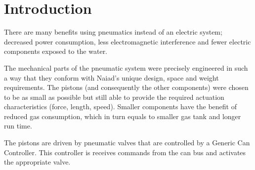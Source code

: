 \section{Introduction}\label{sec:introduction}
There are many benefits using pneumatics instead of an electric  system; decreased power consumption, less electromagnetic interference and fewer electric components exposed to the water.

The mechanical parts of the pneumatic system were precisely engineered in such a way that they conform with Naiad's unique design, space and weight requirements. The pistons (and consequently the other components) were chosen to be as small as possible but still able to provide the required actuation characteristics (force, length, speed). Smaller components have the benefit of reduced gas consumption, which in turn equals to smaller gas tank and longer run time.

The pistons are driven by pneumatic valves that are controlled by a Generic Can Controller. This controller is receives commands from the can bus and activates the appropriate valve.
